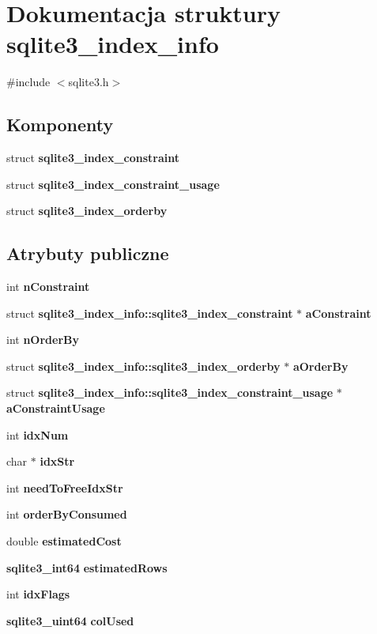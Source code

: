 \section{Dokumentacja struktury sqlite3\+\_\+index\+\_\+info}
\label{structsqlite3__index__info}


{\ttfamily \#include $<$sqlite3.\+h$>$}

\subsection*{Komponenty}
\begin{DoxyCompactItemize}
\item 
struct \textbf{ sqlite3\+\_\+index\+\_\+constraint}
\item 
struct \textbf{ sqlite3\+\_\+index\+\_\+constraint\+\_\+usage}
\item 
struct \textbf{ sqlite3\+\_\+index\+\_\+orderby}
\end{DoxyCompactItemize}
\subsection*{Atrybuty publiczne}
\begin{DoxyCompactItemize}
\item 
int \textbf{ n\+Constraint}
\item 
struct \textbf{ sqlite3\+\_\+index\+\_\+info\+::sqlite3\+\_\+index\+\_\+constraint} $\ast$ \textbf{ a\+Constraint}
\item 
int \textbf{ n\+Order\+By}
\item 
struct \textbf{ sqlite3\+\_\+index\+\_\+info\+::sqlite3\+\_\+index\+\_\+orderby} $\ast$ \textbf{ a\+Order\+By}
\item 
struct \textbf{ sqlite3\+\_\+index\+\_\+info\+::sqlite3\+\_\+index\+\_\+constraint\+\_\+usage} $\ast$ \textbf{ a\+Constraint\+Usage}
\item 
int \textbf{ idx\+Num}
\item 
char $\ast$ \textbf{ idx\+Str}
\item 
int \textbf{ need\+To\+Free\+Idx\+Str}
\item 
int \textbf{ order\+By\+Consumed}
\item 
double \textbf{ estimated\+Cost}
\item 
\textbf{ sqlite3\+\_\+int64} \textbf{ estimated\+Rows}
\item 
int \textbf{ idx\+Flags}
\item 
\textbf{ sqlite3\+\_\+uint64} \textbf{ col\+Used}
\end{DoxyCompactItemize}


